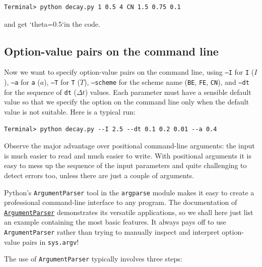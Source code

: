 \documentclass[%
oneside,                 %
final,                   %
10pt]{article}
\begin{document}
\begin{Verbatim}[frame=lines,label=\fbox{{\tiny Terminal}},framesep=2.5mm,framerule=0.7pt,fontsize=\fontsize{9pt}{9pt}]
Terminal> python decay.py 1 0.5 4 CN 1.5 0.75 0.1
\end{Verbatim}
and get `theta=0.5`in the code.


\subsection{Option-value pairs on the command line}


Now we want to specify option-value pairs on the command line,
using \texttt{--I} for \texttt{I} ($I$), \texttt{--a} for \texttt{a} ($a$), \texttt{--T} for \texttt{T} ($T$),
\texttt{--scheme} for the scheme name (\texttt{BE}, \texttt{FE}, \texttt{CN}),
and \texttt{--dt} for the sequence of \texttt{dt} ($\Delta t$) values.
Each parameter must have a sensible default value so
that we specify the option on the command line only when the default
value is not suitable. Here is a typical run:

\begin{Verbatim}[frame=lines,label=\fbox{{\tiny Terminal}},framesep=2.5mm,framerule=0.7pt,fontsize=\fontsize{9pt}{9pt}]
Terminal> python decay.py --I 2.5 --dt 0.1 0.2 0.01 --a 0.4
\end{Verbatim}
Observe the major advantage over positional command-line arguments:
the input is much easier to read and much easier to write.
With positional arguments it is easy to mess up the sequence of
the input parameters and quite challenging to detect errors too,
unless there are just a couple of arguments.

Python's \texttt{ArgumentParser} tool in the \texttt{argparse} module makes it easy
to create a professional command-line interface to any program. The
documentation of \href{{http://docs.python.org/library/argparse.html}}{\nolinkurl{ArgumentParser}} demonstrates its
versatile applications, so we shall here just list an example
containing the most basic features. It always pays off to use \texttt{ArgumentParser}
rather than trying to manually inspect and interpret option-value pairs
in \texttt{sys.argv}!

The use of \texttt{ArgumentParser} typically involves three steps:
\end{document}
